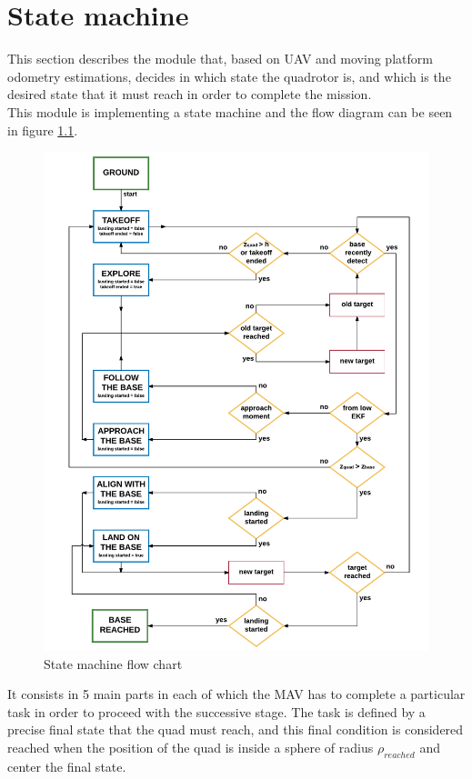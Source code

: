 \chapter{State machine}\label{chap:area_exploration}
This section describes the module that, based on UAV and moving platform odometry estimations, decides in which state the quadrotor is, and which is the desired state that it must reach in order to complete the mission.\\
This module is implementing a state machine and the flow diagram can be seen in figure     \ref{fig:area_exploration_state_machine}.

\begin{figure}[!htbp]
    \centering
    \includegraphics[width=1\textwidth]{img/state_machine.pdf}
    \caption{State machine flow chart}
    \label{fig:area_exploration_state_machine}
\end{figure}

It consists in 5 main parts in each of which the MAV has to complete a particular task in order to proceed with the successive stage. The task is defined by a precise final state that the quad must reach, and this final condition is considered reached when the position of the quad is inside a sphere of radius $\rho_{reached}$ and center the final state.\\

